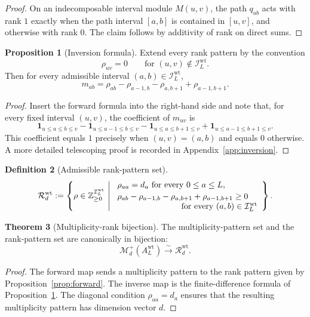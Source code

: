 \documentclass[11pt]{article}
\newcommand{\Z}{\mathbb{Z}}
\theoremstyle{definition}
\newtheorem{theorem}{Theorem}[section]
\newtheorem{proposition}[theorem]{Proposition}
\newtheorem{definition}[theorem]{Definition}
\begin{document}
\begin{proof}
On an indecomposable interval module \(M(u,v)\), the path \(q_{ab}\) acts with
rank \(1\) exactly when the path interval \([a,b]\) is contained in \([u,v]\),
and otherwise with rank \(0\). The claim follows by additivity of rank on
direct sums.
\end{proof}

\begin{proposition}[Inversion formula]
\label{prop:inversion}
Extend every rank pattern by the convention
\[
\rho_{uv}=0
\qquad
\text{for }(u,v)\notin \mathcal I_L^{\mathrm{wt}}.
\]
Then for every admissible interval \((a,b)\in \mathcal I_L^{\mathrm{wt}}\),
\[
m_{ab}
=
\rho_{ab}-\rho_{a-1,b}-\rho_{a,b+1}+\rho_{a-1,b+1}.
\]
\end{proposition}

\begin{proof}
Insert the forward formula into the right-hand side and note that, for every
fixed interval \((u,v)\), the coefficient of \(m_{uv}\) is
\[
\mathbf 1_{u\leq a\leq b\leq v}
-\mathbf 1_{u\leq a-1\leq b\leq v}
-\mathbf 1_{u\leq a\leq b+1\leq v}
+\mathbf 1_{u\leq a-1\leq b+1\leq v}.
\]
This coefficient equals \(1\) precisely when \((u,v)=(a,b)\) and equals \(0\)
otherwise. A more detailed telescoping proof is recorded in
Appendix~\ref{app:inversion}.
\end{proof}

\begin{definition}[Admissible rank-pattern set]
\[
\mathcal R_d^{\mathrm{wt}}
:=
\left\{
\rho\in \Z_{\geq 0}^{\mathcal I_L^{\mathrm{wt}}}
\ \middle|\
\begin{array}{l}
\rho_{aa}=d_a \text{ for every }0\leq a\leq L,\\[2pt]
\rho_{ab}-\rho_{a-1,b}-\rho_{a,b+1}+\rho_{a-1,b+1}\geq 0\\
\hspace{2.7cm}\text{for every }(a,b)\in \mathcal I_L^{\mathrm{wt}}
\end{array}
\right\}.
\]
\end{definition}

\begin{theorem}[Multiplicity-rank bijection]
\label{thm:rank-bijection}
The multiplicity-pattern set and the rank-pattern set are canonically in
bijection:
\[
\mathcal M_d^+(A_L^{\mathrm{wt}})
\xrightarrow{\sim}
\mathcal R_d^{\mathrm{wt}}.
\]
\end{theorem}

\begin{proof}
The forward map sends a multiplicity pattern to the rank pattern given by
Proposition~\ref{prop:forward}. The inverse map is the finite-difference formula
of Proposition~\ref{prop:inversion}. The diagonal condition \(\rho_{aa}=d_a\)
ensures that the resulting multiplicity pattern has dimension vector \(d\).
\end{proof}
\end{document}
